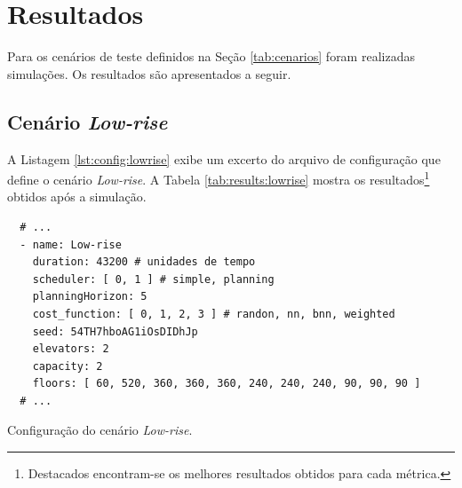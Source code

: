 \chapter{\label{chap:results}Resultados}

Para os cenários de teste definidos na Seção \ref{tab:cenarios} foram realizadas
simulações. Os resultados são apresentados a seguir.

\section{Cenário \textit{Low-rise}}

A Listagem \ref{lst:config:lowrise} exibe um excerto do arquivo de configuração
que define o cenário \textit{Low-rise}. A Tabela \ref{tab:results:lowrise}
mostra os resultados\footnote{Destacados encontram-se os melhores resultados
obtidos para cada métrica.} obtidos após a simulação.

\begin{listing}[htb]
  \centering
    \begin{verbatim}
  # ...
  - name: Low-rise
    duration: 43200 # unidades de tempo
    scheduler: [ 0, 1 ] # simple, planning
    planningHorizon: 5
    cost_function: [ 0, 1, 2, 3 ] # randon, nn, bnn, weighted
    seed: 54TH7hboAG1iOsDIDhJp
    elevators: 2
    capacity: 2
    floors: [ 60, 520, 360, 360, 360, 240, 240, 240, 90, 90, 90 ]
  # ...
    \end{verbatim}
  \caption{Configuração do cenário \textit{Low-rise}.}
  \label{lst:config:lowrise}
\end{listing}

